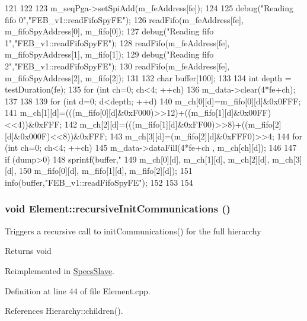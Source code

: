\begin{DoxyCode}
121                                              {
122    
123   m_seqPga->setSpiAdd(m_feAddress[fe]);
124 
125   debug("Reading fifo 0","FEB_v1::readFifoSpyFE");
126   readFifo(m_feAddress[fe], m_fifoSpyAddress[0], m_fifo[0]);
127   debug("Reading fifo 1","FEB_v1::readFifoSpyFE");
128   readFifo(m_feAddress[fe], m_fifoSpyAddress[1], m_fifo[1]);
129   debug("Reading fifo 2","FEB_v1::readFifoSpyFE");
130   readFifo(m_feAddress[fe], m_fifoSpyAddress[2], m_fifo[2]);
131   
132   char buffer[100];
133   
134   int depth = testDuration(fe);
135   for (int ch=0; ch<4; ++ch){
136     m_data->clear(4*fe+ch);
137   }
138   
139   for (int d=0; d<depth; ++d){ 
140     m_ch[0][d]=m_fifo[0][d]&0x0FFF;
141     m_ch[1][d]=(((m_fifo[0][d]&0xF000)>>12)+((m_fifo[1][d]&0x00FF)<<4))&0xFFF;
142     m_ch[2][d]=(((m_fifo[1][d]&0xFF00)>>8)+((m_fifo[2][d]&0x000F)<<8))&0xFFF;
143     m_ch[3][d]=(m_fifo[2][d]&0xFFF0)>>4;
144     for (int ch=0; ch<4; ++ch){
145       m_data->dataFill(4*fe+ch , m_ch[ch][d]);
146     }
147     if (dump>0) {
148       sprintf(buffer,"%
149           m_ch[0][d], m_ch[1][d], m_ch[2][d], m_ch[3][d],
150           m_fifo[0][d], m_fifo[1][d], m_fifo[2][d]);
151       info(buffer,"FEB_v1::readFifoSpyFE");
152     }
153   }
154 }
\end{DoxyCode}
\hypertarget{classElement_a82119ed37dff76508a2746a853ec35ba}{
\subsubsection[{recursiveInitCommunications}]{\setlength{\rightskip}{0pt plus 5cm}void Element::recursiveInitCommunications ()}}
\label{classElement_a82119ed37dff76508a2746a853ec35ba}
Triggers a recursive call to initCommunications() for the full hierarchy

\begin{DoxyReturn}{Returns}
void 
\end{DoxyReturn}


Reimplemented in \hyperlink{classSpecsSlave_a347b94c2ba660ccde6927fe72590a1bc}{SpecsSlave}.

Definition at line 44 of file Element.cpp.

References Hierarchy::children().

